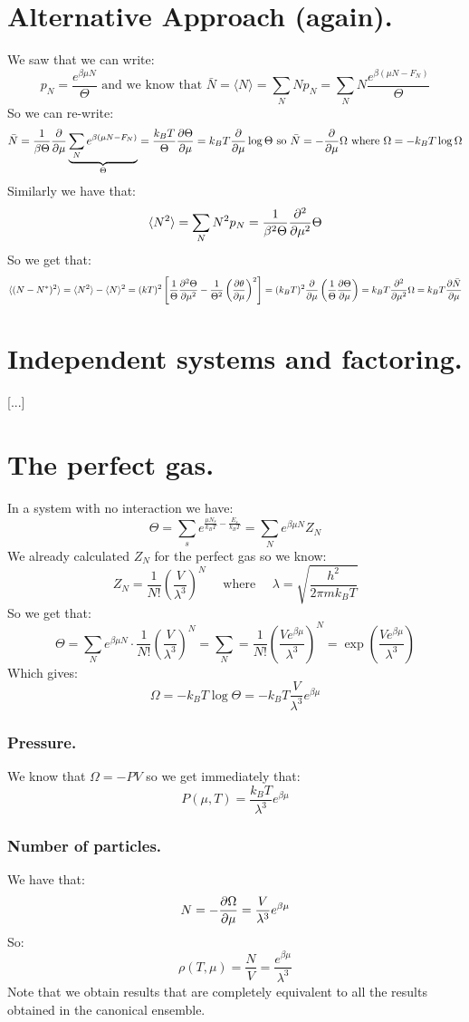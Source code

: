 \documentclass[10pt,a4paper]{book}
\begin{document}
\section{Alternative Approach (again).}
We saw that we can write:
\[
p_N = \frac{e^{\beta \mu N}}{\Theta} \text{ and we know that } \bar{N} = \langle N \rangle = \sum_N N p_N = \sum_N N \frac{e^{\beta(\mu N - F_N)}}{\Theta}
\]
So we can re-write:
\[
\bar{N} = \frac{1}{\beta \Theta} \pdv{}{\mu} \underbrace{\sum_N e^{\beta(\mu N - F_N)}}_\Theta = \frac{k_B T}{\Theta} \pdv{\Theta}{\mu} = k_B T \pdv{}{\mu} \log \Theta \text{ so } \bar{N} = - \pdv{}{\mu} \Omega \text{ where } \Omega = - k_B T \log \Omega
\]
Similarly we have that:
\[
\langle N^2 \rangle = \sum_N N^2 p_N = \frac{1}{\beta^2 \Theta} \pdv[2]{}{\mu} \Theta
\]
So we get that:
\[
\langle (N - N^*)^2 \rangle = \langle N^2 \rangle - \langle N \rangle^2 = (kT)^2 \left[ \frac{1}{\Theta} \pdv[2]{\Theta}{\mu} - \frac{1}{\Theta^2} \left(\pdv{\theta}{\mu}\right)^2 \right] = (k_B T)^2 \pdv{}{\mu} \left(\frac{1}{\Theta} \pdv{\Theta}{\mu}\right) = k_B T \pdv[2]{}{\mu} \Omega = k_B T \pdv{\bar{N}}{\mu}
\]

\section{Independent systems and factoring.}
[...]
\section{The perfect gas.}
In a system with no interaction we have:
\[
\Theta = \sum_s e^{\frac{\mu N_s}{k_B T} - \frac{E_s}{k_B T}} = \sum_N e^{\beta \mu N} Z_N
\]
We already calculated $Z_N$ for the perfect gas so we know:
\[
Z_N = \frac{1}{N!}\left(\frac{V}{\lambda^3}\right)^N \quad \text{ where } \quad \lambda = \sqrt{\frac{h^2}{2\pi m k_B T}}
\]
So we get that:
\[
\Theta = \sum_N e^{\beta \mu N} \cdot \frac{1}{N!} \left(\frac{V}{\lambda^3}\right)^N = \sum_N = \frac{1}{N!}\left(\frac{V e^{\beta \mu}}{\lambda^3}\right)^N = \exp(\frac{V e^{\beta \mu}}{\lambda^3})
\]
Which gives:
\[
\Omega = - k_B T \log \Theta = - k_B T \frac{V}{\lambda^3} e^{\beta\mu}
\]

\subsubsection{Pressure.}
We know that $\Omega = - PV$ so we get immediately that:
\[
P(\mu, T) = \frac{k_B T}{\lambda^3} e^{\beta \mu}
\]

\subsubsection{Number of particles.}
We have that:
\[
N = - \pdv{\Omega}{\mu} = \frac{V}{\lambda^3} e^{\beta \mu}
\]
So:
\[
\rho(T, \mu) = \frac{N}{V} = \frac{e^{\beta\mu}}{\lambda^3}
\]
Note that we obtain results that are completely equivalent to all the results obtained in the canonical ensemble.
\end{document}
